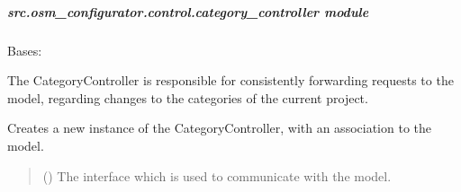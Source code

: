 \documentclass[letterpaper,10pt,english]{sphinxmanual}
\begin{document}
\subparagraph{src.osm\_configurator.control.category\_controller module}
\label{\detokenize{apidoc/src.osm_configurator.control:module-src.osm_configurator.control.category_controller}}\label{\detokenize{apidoc/src.osm_configurator.control:src-osm-configurator-control-category-controller-module}}

\begin{fulllineitems}
\label{\detokenize{apidoc/src.osm_configurator.control:src.osm_configurator.control.category_controller.CategoryController}}
\pysigstartsignatures
{}
\pysigstopsignatures
\sphinxAtStartPar
Bases: 

\sphinxAtStartPar
The CategoryController is responsible for consistently forwarding requests to the model,
regarding changes to the categories of the current project.

\begin{fulllineitems}
\label{\detokenize{apidoc/src.osm_configurator.control:src.osm_configurator.control.category_controller.CategoryController.__init__}}
\pysigstartsignatures
{}
\pysigstopsignatures
\sphinxAtStartPar
Creates a new instance of the CategoryController, with an association to the model.
\begin{quote}\begin{description}
\sphinxAtStartPar
{} ({\hyperref[\detokenize{apidoc/src.osm_configurator.model.application:src.osm_configurator.model.application.application_interface.IApplication}]{}}) \textendash{} The interface which is used to communicate with the model.


\end{description}
\end{quote}
\end{fulllineitems}
\end{fulllineitems}
\end{document}
